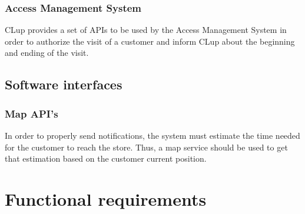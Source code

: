 \documentclass[a4paper,oneside,11pt]{book}   %
\begin{document}
    \subsubsection{Access Management System}
    CLup provides a set of APIs to be used by the Access Management System in order to authorize the visit of a customer and inform CLup about the beginning and ending of the visit.
    
    \subsection{Software interfaces}
    \subsubsection{Map API's}
    In order to properly send notifications, the system must estimate the time needed for the customer to reach the store. Thus, a map service should be used to get that estimation based on the customer current position.
    
    \section{Functional requirements}
\end{document}
